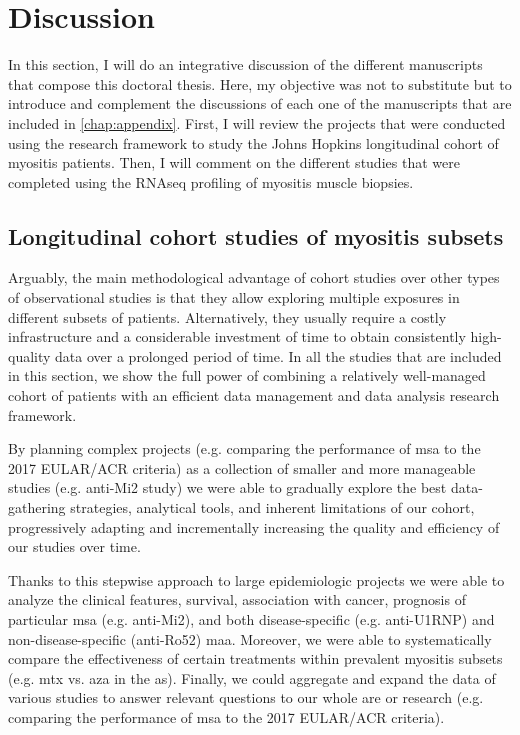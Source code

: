 \chapter{Discussion}

In this section, I will do an integrative discussion of the different manuscripts that compose this doctoral thesis. Here, my objective was not to substitute but to introduce and complement the discussions of each one of the manuscripts that are included in \autoref{chap:appendix}. First, I will review the projects that were conducted using the research framework to study the Johns Hopkins longitudinal cohort of myositis patients. Then, I will comment on the different studies that were completed using the RNAseq profiling of myositis muscle biopsies. 

\section{Longitudinal cohort studies of myositis subsets}

Arguably, the main methodological advantage of cohort studies over other types of observational studies is that they allow exploring multiple exposures in different subsets of patients. Alternatively, they usually require a costly infrastructure and a considerable investment of time to obtain consistently high-quality data over a prolonged period of time. In all the studies that are included in this section, we show the full power of combining a relatively well-managed cohort of patients with an efficient data management and data analysis research framework.

By planning complex projects (e.g. comparing the performance of \gls{msa} to the 2017 EULAR/ACR criteria) as a collection of smaller and more manageable studies (e.g. anti-Mi2 study) we were able to gradually explore the best data-gathering strategies, analytical tools, and inherent limitations of our cohort, progressively adapting and incrementally increasing the quality and efficiency of our studies over time.

Thanks to this stepwise approach to large epidemiologic projects we were able to analyze the clinical features, survival, association with cancer, prognosis of particular \gls{msa} (e.g. anti-Mi2), and both disease-specific (e.g. anti-U1RNP) and non-disease-specific (anti-Ro52) \gls{maa}. Moreover, we were able to systematically compare the effectiveness of certain treatments within prevalent myositis subsets (e.g. \gls{mtx} vs. \gls{aza} in the \gls{as}). Finally, we could aggregate and expand the data of various studies to answer relevant questions to our whole are or research (e.g. comparing the performance of \gls{msa} to the 2017 EULAR/ACR criteria).

